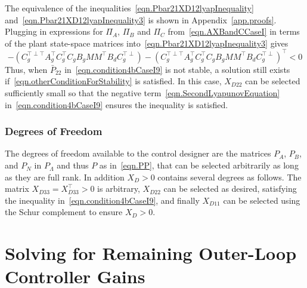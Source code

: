 The equivalence of the inequalities\ \eqref{eqn.Pbar21XD12lyapInequality} and\ \eqref{eqn.Pbar21XD12lyapInequality3} is shown in Appendix~\ref{app.proofs}.
Plugging in expressions for $\Pi_{A}$, $\Pi_{B}$ and $\Pi_{C}$ from\ \eqref{eqn.AXBandCCaseI} in terms of the plant state-space matrices into\ \eqref{eqn.Pbar21XD12lyapInequality3} gives
\begin{equation}
  \label{eqn.otherConditionForStability}
  -(C_{g}^{\top\perp\top}A_{g}^{\top}C_{g}^{\top}C_{g}B_{g}MM^{\top}B_{d}C_{g}^{\top\perp})
  -
  (C_{g}^{\top\perp\top}A_{g}^{\top}C_{g}^{\top}C_{g}B_{g}MM^{\top}B_{d}C_{g}^{\top\perp})^{\top}
  <0
\end{equation}
Thus, when $\bar{P}_{22}$ in\ \eqref{eqn.condition4bCaseI9} is not stable, a solution still exists if\ \eqref{eqn.otherConditionForStability} is satisfied.
In this case, $X_{D22}$ can be selected sufficiently small so that the negative term\ \eqref{eqn.SecondLyapunovEquation} in\ \eqref{eqn.condition4bCaseI9} ensures the inequality is satisfied.

\subsubsection{Degrees of Freedom}

The degrees of freedom available to the control designer are the matrices $P_{A}$, $P_{B}$, and $P_{N}$ in $P_{\Lambda}$ and thus $P$ as in\ \eqref{eqn.PP}, that can be selected arbitrarily as long as they are full rank.
In addition $X_{D}>0$ contains several degrees as follows.
The matrix $X_{D33}=X_{D33}^{\top}>0$ is arbitrary, $X_{D22}$ can be selected as desired, satisfying the inequality in\ \eqref{eqn.condition4bCaseI9}, and finally $X_{D11}$ can be selected using the Schur complement to ensure $X_{D}>0$.

\section{Solving for Remaining Outer-Loop Controller Gains}


